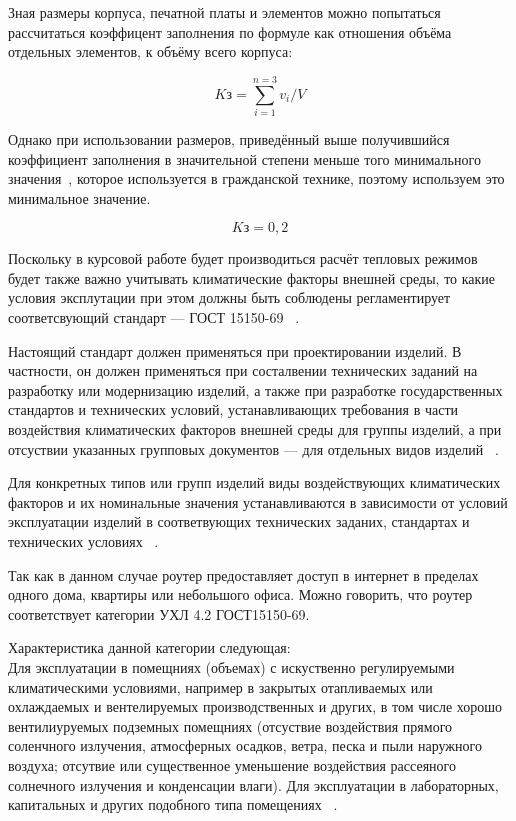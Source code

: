 Зная размеры корпуса, печатной платы и элементов можно попытаться рассчитаться коэффицент заполнения 
по формуле как отношения объёма отдельных элементов, к объёму всего корпуса:

\begin{equation}
K\mathrm{з} = \sum^{n=3}_{i=1} v_{i}/V
\end{equation}

Однако при использовании размеров, приведённый выше
получившийся коэффициент заполнения в значительной степени меньше того
минимального значения~\cite{KP-POIMFP}, которое используется в
гражданской технике, поэтому используем это минимальное значение.

$$K\mathrm{з} = 0,2$$


Поскольку в курсовой работе будет производиться расчёт тепловых
режимов будет также важно учитывать климатические факторы внешней
среды, то какие условия эксплутации при этом должны быть соблюдены
регламентирует соответсвующий стандарт — ГОСТ 15150-69
~\cite{GOST-15150-69}.

Настоящий стандарт должен применяться при проектировании изделий.  В
частности, он должен применяться при состалвении технических заданий
на разработку или модернизацию изделий, а также при разработке
государственных стандартов и технических условий, устанавливающих
требования в части воздействия климатических факторов внешней среды
для группы изделий, а при отсуствии указанных групповых документов —
для отдельных видов изделий ~\cite{GOST-15150-69}.

Для конкретных типов или групп изделий виды воздействующих
климатических факторов и их номинальные значения устанавливаются в
зависимости от условий эксплуатации изделий в соответвующих
технических заданих, стандартах и технических условиях ~\cite{GOST-15150-69}.

Так как в данном случае роутер предоставляет доступ в интернет в
пределах одного дома, квартиры или небольшого офиса. Можно говорить,
что роутер соответствует категории УХЛ 4.2 ГОСТ15150-69.

Характеристика данной категории следующая:\\
Для эксплуатации в помещниях (объемах) с искуственно регулируемыми
климатическими условиями, например в закрытых отапливаемых или
охлаждаемых и вентелируемых производственных и других, в том числе
хорошо вентилиуруемых подземных помещниях (отсуствие воздействия
прямого соленчного излучения, атмосферных осадков, ветра, песка и пыли
наружного воздуха; отсутвие или существенное уменьшение воздействия
рассеяного солнечного излучения и конденсации влаги). Для эксплуатации
в лабораторных, капитальных и других подобного типа помещениях ~\cite{GOST-15150-69}.

